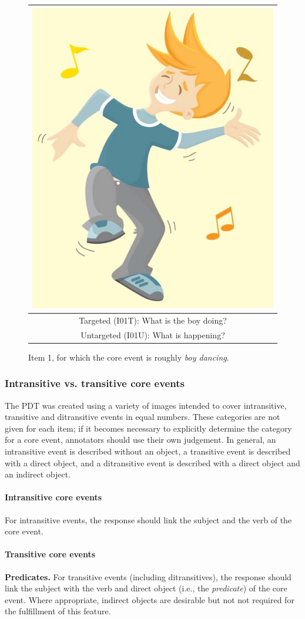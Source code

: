 \documentclass[12pt,notitlepage]{article}
\begin{document}
\begin{figure}[h]
\begin{center}
\begin{tabular}{|c|}
\hline
\includegraphics[width=0.4\columnwidth,trim=0 0 0 -3]{figures/I01.jpg}\\
\hline
Targeted (I01T): What is the boy doing?\\
\hline
Untargeted (I01U): What is happening? \\
\hline
\end{tabular}
\end{center}
\caption{Item 1, for which the core event is roughly \textit{boy dancing}.}
\label{fig:dance}
\end{figure}

\subsubsection{Intransitive vs. transitive core events} The PDT was created using a variety of images intended to cover intransitive, transitive and ditransitive events in equal numbers. These categories are not given for each item; if it becomes necessary to explicitly determine the category for a core event, annotators should use their own judgement. In general, an intransitive event is described without an object, a transitive event is described with a direct object, and a ditransitive event is described with a direct object and an indirect object.

\paragraph{Intransitive core events} For intransitive events, the response should link the subject and the verb of the core event.

\paragraph{Transitive core events} \textbf{Predicates.} For transitive events (including ditransitives), the response should link the subject with the verb and direct object (i.e., the \textit{predicate}) of the core event. Where appropriate, indirect objects are desirable but not not required for the fulfillment of this feature. 
\end{document}
